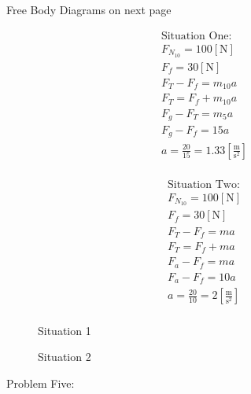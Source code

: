 \documentclass[12pt]{article}
\begin{document}
\hline

\begin{center}
  Free Body Diagrams on next page
\end{center}

\begin{equation}
  \begin{split}
    \text{Situation One:}\\
    F_{N_{10}}=100[\si{\newton}]\\
  F_f=30[\si{\newton}]\\
  F_T-F_f=m_{10}a\\
  F_T=F_f+m_{10}a\\
  F_g-F_T=m_{5}a\\
  F_g-F_f=15a\\
  a=\frac{20}{15}=1.33\left[ \frac{\si{\meter}}{\si{\second\squared}} \right]\\
\end{split}
  \label{13}
\end{equation}

\begin{equation}
  \begin{split}
    \text{Situation Two:}\\
    F_{N_{10}}=100[\si{\newton}]\\
  F_f=30[\si{\newton}]\\
  F_T-F_f=ma\\
  F_T=F_f+ma\\
  F_a-F_f=ma\\
  F_a-F_f=10a\\
  a=\frac{20}{10}=2\left[ \frac{\si{\meter}}{\si{\second\squared}} \right]\\
\end{split}
  \label{14}
\end{equation}

    \begin{figure}[H]
      \centering
      
      \caption{Situation 1}
      \label{fig:2}
    \end{figure}

    \begin{figure}[H]
      \centering
      
      \caption{Situation 2}
      \label{fig:3}
    \end{figure}

\hline

\newpage

\begin{center}
  Problem Five:
\end{center}
\hline
\end{document}
